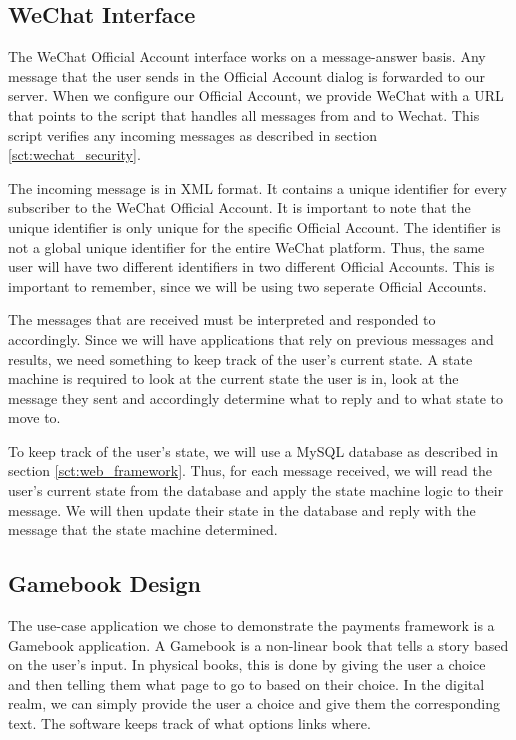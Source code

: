 \subsection{WeChat Interface}

The WeChat Official Account interface works on a message-answer basis. Any message that the user sends in the Official Account dialog is forwarded to our server. When we configure our Official Account, we provide WeChat with a URL that points to the script that handles all messages from and to Wechat. This script verifies any incoming messages as described in section \ref{sct:wechat_security}.

The incoming message is in XML format. It contains a unique identifier for every subscriber to the WeChat Official Account. It is important to note that the unique identifier is only unique for the specific Official Account. The identifier is not a global unique identifier for the entire WeChat platform. Thus, the same user will have two different identifiers in two different Official Accounts. This is important to remember, since we will be using two seperate Official Accounts.

The messages that are received must be interpreted and responded to accordingly. Since we will have applications that rely on previous messages and results, we need something to keep track of the user's current state. A state machine is required to look at the current state the user is in, look at the message they sent and accordingly determine what to reply and to what state to move to. 

To keep track of the user's state, we will use a MySQL database as described in section \ref{sct:web_framework}. Thus, for each message received, we will read the user's current state from the database and apply the state machine logic to their message. We will then update their state in the database and reply with the message that the state machine determined.

\subsection{Gamebook Design}
\label{sct:gamebook_design}

The use-case application we chose to demonstrate the payments framework is a Gamebook application. A Gamebook is a non-linear book that tells a story based on the user's input. In physical books, this is done by giving the user a choice and then telling them what page to go to based on their choice. In the digital realm, we can simply provide the user a choice and give them the corresponding text. The software keeps track of what options links where.

